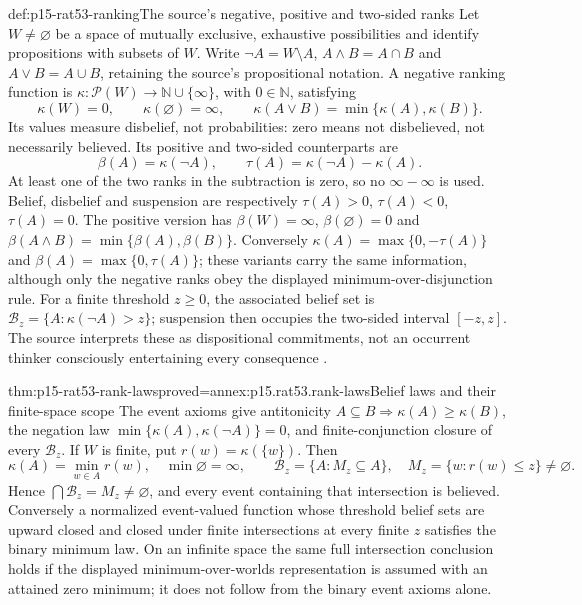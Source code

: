 \begin{hbdefinition}{def:p15-rat53-ranking}{The source's negative, positive and two-sided ranks}
Let \(W\ne\varnothing\) be a space of mutually exclusive, exhaustive
possibilities and identify propositions with subsets of \(W\).
Write \(\neg A=W\setminus A\), \(A\land B=A\cap B\) and
\(A\lor B=A\cup B\), retaining the source's propositional notation.
A negative ranking function is
\(\kappa:\mathcal P(W)\to\mathbb N\cup\{\infty\}\), with
\(0\in\mathbb N\), satisfying
\[
 \kappa(W)=0,\qquad \kappa(\varnothing)=\infty,\qquad
 \kappa(A\lor B)=\min\{\kappa(A),\kappa(B)\}.
\]
Its values measure disbelief, not probabilities: zero means not disbelieved,
not necessarily believed.  Its positive and two-sided counterparts are
\[
 \beta(A)=\kappa(\neg A),\qquad
 \tau(A)=\kappa(\neg A)-\kappa(A).
\]
At least one of the two ranks in the subtraction is zero, so no
\(\infty-\infty\) is used.  Belief, disbelief and suspension are
respectively \(\tau(A)>0\), \(\tau(A)<0\), \(\tau(A)=0\).
The positive version has \(\beta(W)=\infty\),
\(\beta(\varnothing)=0\) and
\(\beta(A\land B)=\min\{\beta(A),\beta(B)\}\).
Conversely \(\kappa(A)=\max\{0,-\tau(A)\}\) and
\(\beta(A)=\max\{0,\tau(A)\}\); these variants carry the same
information, although only the negative ranks obey the displayed
minimum-over-disjunction rule.
For a finite threshold \(z\geq0\), the associated belief set is
\(\mathcal B_z=\{A:\kappa(\neg A)>z\}\); suspension then occupies
the two-sided interval \([-z,z]\).  The source interprets these as
dispositional commitments, not an occurrent thinker consciously entertaining
every consequence \parencite[pp.~337--339]{KernIsbernerSkovgaardOlsenSpohn2021Ranking}.
\end{hbdefinition}

\begin{hbtheorem}{thm:p15-rat53-rank-laws}{proved=annex:p15.rat53.rank-laws}{Belief laws and their finite-space scope}
The event axioms give antitonicity \(A\subseteq B\Rightarrow
\kappa(A)\geq\kappa(B)\), the negation law
\(\min\{\kappa(A),\kappa(\neg A)\}=0\), and finite-conjunction
closure of every \(\mathcal B_z\).
If \(W\) is finite, put \(r(w)=\kappa(\{w\})\).  Then
\[
 \kappa(A)=\min_{w\in A}r(w),\quad \min\varnothing=\infty,
 \qquad
 \mathcal B_z=\{A:M_z\subseteq A\},\quad
 M_z=\{w:r(w)\leq z\}\ne\varnothing.
\]
Hence \(\bigcap\mathcal B_z=M_z\ne\varnothing\), and every event
containing that intersection is believed.  Conversely a normalized
event-valued function whose threshold belief sets are upward closed and
closed under finite intersections at every finite \(z\) satisfies the
binary minimum law.  On an infinite space the same full intersection
conclusion holds if the displayed minimum-over-worlds representation is
assumed with an attained zero minimum; it does not follow from the binary
event axioms alone.
\end{hbtheorem}


